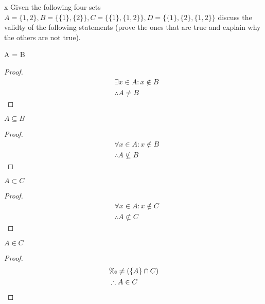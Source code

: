 \begin{question}x
  Given the following four sets
  \begin{math}
    A = \{1, 2\}, B = \{\{1\}, \{2\}\}, C = \{\{1\},\{1, 2\}\}, D = \{\{1\}, \{2\}, \{1, 2\}\}
  \end{math}
  discuss the validty of the following statements (prove the ones that are true and explain why the others are not true).

  \begin{subquestion}
    A = B
  \end{subquestion}
  \begin{proof}
    \begin{equation}
      \begin{split}
        & \exists x \in A: x \notin B \\
        & \therefore A \neq B
      \end{split}
    \end{equation}
  \end{proof}

  \begin{subquestion}
    $A \subseteq B$
  \end{subquestion}
  \begin{proof}
    \begin{equation}
      \begin{split}
        & \forall x \in A: x \notin B \\
        & \therefore A \nsubseteq B
      \end{split}
    \end{equation}
  \end{proof}

  \begin{subquestion}
    $A \subset C$
  \end{subquestion}
  \begin{proof}
    \begin{equation}
      \begin{split}
        & \forall x \in A: x \notin C \\
        & \therefore A \not \subset C
      \end{split}
    \end{equation}
  \end{proof}

  \begin{subquestion}
    $A \in C$
  \end{subquestion}
  \begin{proof}
    \begin{equation}
      \begin{split}
        & \O \neq (\{A\} \cap C) \\
        & \therefore A \in C
      \end{split}
    \end{equation}
  \end{proof}
\end{question}